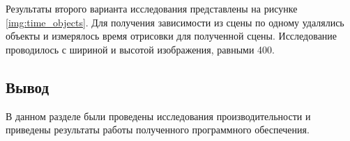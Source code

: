 
Результаты второго варианта исследования представлены на рисунке \ref{img:time_objects}. Для получения зависимости из сцены по одному удалялись объекты и измерялось время отрисовки для полученной сцены. Исследование проводилось с шириной и высотой изображения, равными 400.



\clearpage

\subsection*{Вывод}

В данном разделе были проведены исследования производительности и приведены результаты работы полученного программного обеспечения.